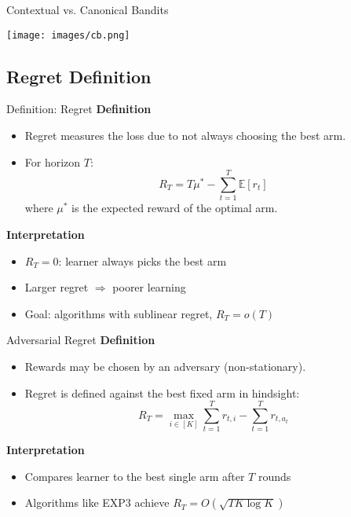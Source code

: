 \documentclass{beamer}
\begin{document}
\begin{frame}{Contextual vs. Canonical Bandits}
  \begin{center}
    \texttt{[image: images/cb.png]}
  \end{center}
\end{frame}






\subsection{Regret Definition}


\begin{frame}{Definition: Regret}
  \textbf{Definition}
  \begin{itemize}
    \item Regret measures the loss due to not always choosing the best arm.
    \item For horizon $T$:
    \[
      R_T = T \mu^\ast - \sum_{t=1}^T \mathbb{E}[r_t]
    \]
    where $\mu^\ast$ is the expected reward of the optimal arm.
  \end{itemize}

  \vspace{1em}
  \textbf{Interpretation}
  \begin{itemize}
    \item $R_T = 0$: learner always picks the best arm
    \item Larger regret $\Rightarrow$ poorer learning
    \item Goal: algorithms with sublinear regret, $R_T = o(T)$
  \end{itemize}
\end{frame}

\begin{frame}{Adversarial Regret}
  \textbf{Definition}
  \begin{itemize}
    \item Rewards may be chosen by an adversary (non-stationary).
    \item Regret is defined against the best fixed arm in hindsight:
    \[
      R_T = \max_{i \in [K]} \sum_{t=1}^T r_{t,i} - \sum_{t=1}^T r_{t,a_t}
    \]
  \end{itemize}

  \vspace{1em}
  \textbf{Interpretation}
  \begin{itemize}
    \item Compares learner to the best single arm after $T$ rounds
    \item Algorithms like EXP3 achieve $R_T = O(\sqrt{T K \log K})$
  \end{itemize}
\end{frame}
\end{document}
